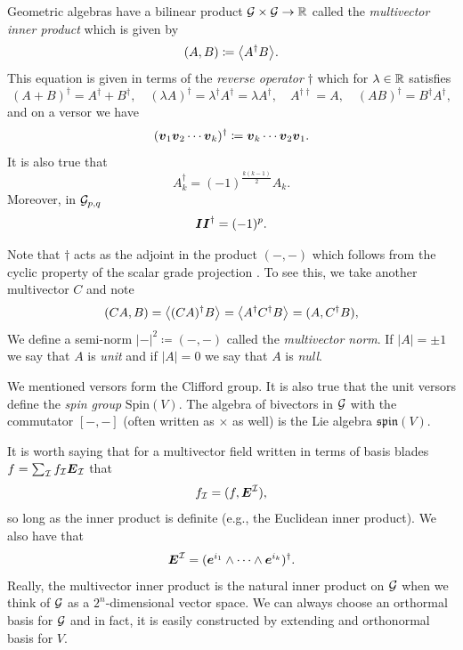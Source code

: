 \documentclass{article}
\begin{document}
Geometric algebras have a bilinear product $\mathcal{G} \times \mathcal{G} \to \mathbb{R}$ called the \emph{multivector inner product} which is given by
\begin{equation}
(A,B) \coloneqq \proj{}{A^\dagger B}.
\end{equation}
This equation is given in terms of the \emph{reverse operator} $\dagger$ which for $\lambda \in \mathbb{R}$ satisfies
\begin{equation}
(A+B)^\dagger=A^\dagger + B^\dagger, \quad (\lambda A)^\dagger = \lambda^\dagger A^\dagger = \lambda A^\dagger, \quad A^{\dagger \dagger}=A, \quad (AB)^\dagger = B^\dagger A^\dagger,
\end{equation}
and on a versor we have
\begin{equation}
    (\boldsymbol{v}_1\boldsymbol{v}_2 \cdots \boldsymbol{v}_k)^\dagger \coloneqq \boldsymbol{v}_k \cdots \boldsymbol{v}_2 \boldsymbol{v}_1.
\end{equation}
It is also true that
\begin{equation}
    A_k^\dagger = (-1)^{\frac{k(k-1)}{2}}A_k.
\end{equation}
Moreover, in $\mathcal{G}_{p,q}$
\begin{equation}
    \boldsymbol{I} \boldsymbol{I}^\dagger = (-1)^p.
\end{equation}

Note that $\dagger$ acts as the adjoint in the product $(-,-)$ which follows from the cyclic property of the scalar grade projection \cite[eq. (138)]{chisolm_geometric_2012}. To see this, we take another multivector $C$ and note
\begin{align}
(CA,B) = \left\langle(CA)^\dagger B\right\rangle_{} = \left\langle A^\dagger C^\dagger B \right\rangle_{} = (A,C^\dagger B),
\end{align}
We define a semi-norm $|-|^2\coloneqq (-,-)$ called the \emph{multivector norm}. If $|A|=\pm 1$ we say that $A$ is \emph{unit} and if $|A|=0$ we say that $A$ is \emph{null}.

\begin{remark}
We mentioned versors form the Clifford group. It is also true that the unit versors define the \emph{spin group} $\mathrm{Spin}(V)$. The algebra of bivectors in $\mathcal{G}$ with the commutator $[-,-]$ (often written as $\times$ as well) is the Lie algebra $\mathfrak{spin}(V)$.
\end{remark}

It is worth saying that for a multivector field written in terms of basis blades $f=\sum_{\mathcal{I}} f_\mathcal{I} \boldsymbol{E}_\mathcal{I}$ that
\begin{equation}
\label{eq:inner_product_with_basis}
f_\mathcal{I} = (f, \boldsymbol{E}^\mathcal{I}),
\end{equation}
so long as the inner product is definite (e.g., the Euclidean inner product). We also have that
\begin{equation}
\boldsymbol{E}^\mathcal{I} = (\boldsymbol{e}^{i_1} \wedge \cdots \wedge \boldsymbol{e}^{i_k})^\dagger.
\end{equation}
Really, the multivector inner product is the natural inner product on $\mathcal{G}$ when we think of $\mathcal{G}$ as a $2^n$-dimensional vector space. We can always choose an orthormal basis for $\mathcal{G}$ and in fact, it is easily constructed by extending and orthonormal basis for $V$.
\end{document}
